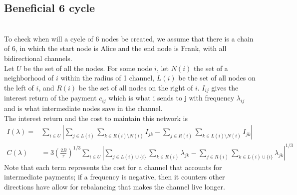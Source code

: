 \documentclass[12pt]{article}
\theoremstyle{plain}
\theoremstyle{remark}
\theoremstyle{definition}
\begin{document}
\subsection{Beneficial 6 cycle}
\\
To check when will a cycle of 6 nodes be created, we assume that there is a chain of 6, in which the start node is Alice and the end node is Frank, with all bidirectional channels. 
\\ Let $U$ be the set of all the nodes. For some node $i$, let $N(i)$ the set of a neighborhood of $i$ within the radius of 1 channel, $L(i)$ be the set of all nodes on the left of $i$, and $R(i)$ be the set of all nodes on the right of $i$. $I_{ij}$ gives the interest return of the payment $c_{ij}$ which is what i sends to j with frequency $\lambda_{ij}$ and is what intermediate nodes save in the channel. 
\\ The interest return and the cost to maintain this network is 
\begin{align}
  I(\lambda) = & \sum_{i\in U}|\sum_{j\in L(i)}\sum_{k\in R(i)\setminus N(i)} I_{jk} - \sum_{j\in R(i)}\sum_{k\in L(i)\setminus N(i)} I_{jk}|\\
  C(\lambda) & = 3(\frac{2B}{r})^{1/3} \sum_{i\in U}|\sum_{j\in L(i)\cup \{i\}}\sum_{k\in R(i)} \lambda_{jk} - \sum_{j\in R(i)}\sum_{k\in L(i)\cup \{i\}} \lambda_{jk}|^{1/3}
\end{align}
Note that each term represents the cost for a channel that accounts for intermediate payments; if a frequency is negative, then it counters other directions have allow for rebalancing that makes the channel live longer. 
\end{document}
